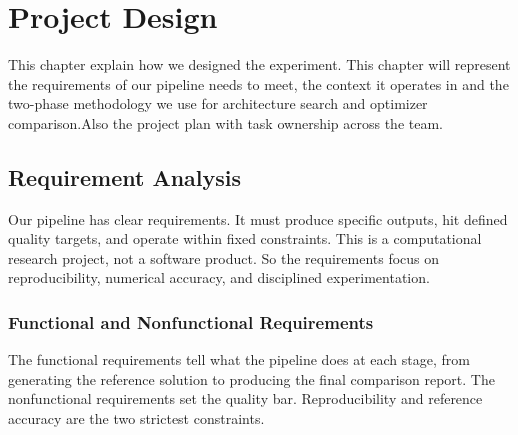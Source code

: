 \chapter{Project Design}

This chapter explain how we designed the experiment. This chapter will represent the requirements of our pipeline needs to meet, the context it operates in and  the two-phase methodology we use for architecture search and optimizer comparison.Also the project plan with task ownership across the team.

\section{Requirement Analysis}

Our pipeline has clear requirements. It must produce specific outputs, hit defined quality targets, and operate within fixed constraints. This is a computational research project, not a software product. So the requirements focus on reproducibility, numerical accuracy, and disciplined experimentation.

\subsection{Functional and Nonfunctional Requirements}

The functional requirements tell what the pipeline does at each stage, from generating the reference solution to producing the final comparison report. The nonfunctional requirements set the quality bar. Reproducibility and reference accuracy are the two strictest constraints.


